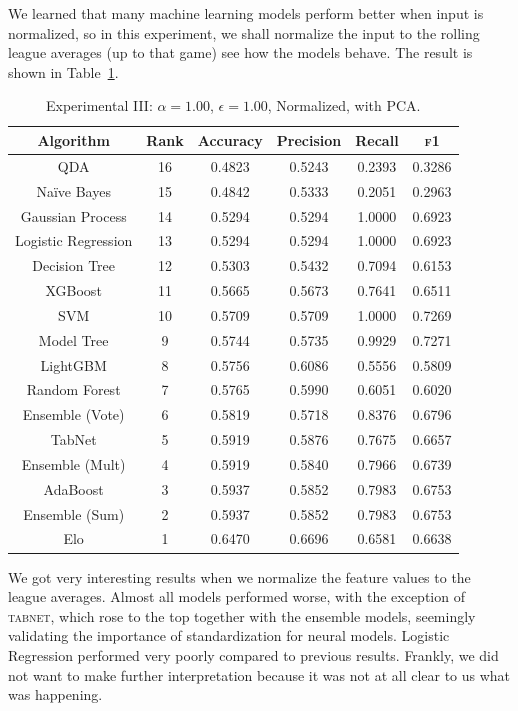 \documentclass[10pt]{article}
\begin{document}
We learned that many machine learning models perform better when input is normalized, so
in this experiment, we shall normalize the input to the rolling league averages
(up to that game) see how the models behave.
The result is shown in Table~\ref{table:experiment-III}.

\begin{table}[htbp]
\centering
\begin{tabular}{|c|c|c|c|c|c|}
\hline
Algorithm & Rank & Accuracy & Precision & Recall & \textsc{f1} \\ \hline
QDA & 16 & 0.4823 & 0.5243 & 0.2393 & 0.3286 \\
Na\"ive Bayes & 15 & 0.4842 & 0.5333 & 0.2051 & 0.2963 \\
Gaussian Process & 14 & 0.5294 & 0.5294 & 1.0000 & 0.6923 \\ \hline
Logistic Regression & 13 & 0.5294 & 0.5294 & 1.0000 & 0.6923 \\ \hline
Decision Tree & 12 & 0.5303 & 0.5432 & 0.7094 & 0.6153 \\
XGBoost & 11 & 0.5665 & 0.5673 & 0.7641 & 0.6511 \\
SVM & 10 & 0.5709 & 0.5709 & 1.0000 & 0.7269 \\
Model Tree & 9 & 0.5744 & 0.5735 & 0.9929 & 0.7271 \\
LightGBM & 8 & 0.5756 & 0.6086 & 0.5556 & 0.5809 \\
Random Forest & 7 & 0.5765 & 0.5990 & 0.6051 & 0.6020 \\
Ensemble (Vote) & 6 & 0.5819 & 0.5718 & 0.8376 & 0.6796 \\
TabNet & 5 & 0.5919 & 0.5876 & 0.7675 & 0.6657 \\
Ensemble (Mult) & 4 & 0.5919 & 0.5840 & 0.7966 & 0.6739 \\
AdaBoost & 3 & 0.5937 & 0.5852 & 0.7983 & 0.6753 \\
Ensemble (Sum) & 2 & 0.5937 & 0.5852 & 0.7983 & 0.6753 \\
Elo & 1 & 0.6470 & 0.6696 & 0.6581 & 0.6638 \\
\hline
\end{tabular}
\caption{Experimental III: $\alpha=1.00$, $\epsilon = 1.00$, Normalized, with PCA.}
\label{table:experiment-III}
\end{table}

We got very interesting results when we normalize the
feature values to the league averages. Almost all
models performed worse, with the exception of \textsc{tabnet},
which rose to the top together with the ensemble models,
seemingly validating the importance of standardization for
neural models.
Logistic Regression performed very poorly compared
to previous results. Frankly, we did not want to make further
interpretation because it was not at all clear to us what was
happening.
\end{document}
